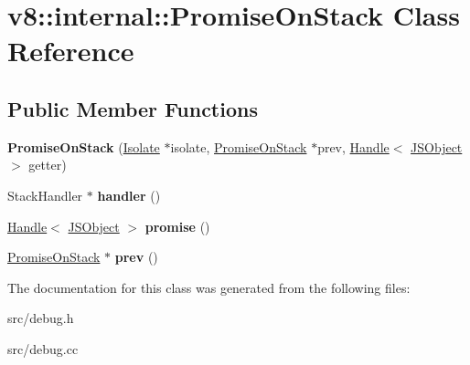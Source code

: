 \hypertarget{classv8_1_1internal_1_1_promise_on_stack}{}\section{v8\+:\+:internal\+:\+:Promise\+On\+Stack Class Reference}
\label{classv8_1_1internal_1_1_promise_on_stack}
\subsection*{Public Member Functions}
\begin{DoxyCompactItemize}
\item 
\hypertarget{classv8_1_1internal_1_1_promise_on_stack_abc2c4f50b63736600999b3a95c252835}{}{\bfseries Promise\+On\+Stack} (\hyperlink{classv8_1_1internal_1_1_isolate}{Isolate} $\ast$isolate, \hyperlink{classv8_1_1internal_1_1_promise_on_stack}{Promise\+On\+Stack} $\ast$prev, \hyperlink{classv8_1_1internal_1_1_handle}{Handle}$<$ \hyperlink{classv8_1_1internal_1_1_j_s_object}{J\+S\+Object} $>$ getter)\label{classv8_1_1internal_1_1_promise_on_stack_abc2c4f50b63736600999b3a95c252835}

\item 
\hypertarget{classv8_1_1internal_1_1_promise_on_stack_a4afb22e2bd5dc6d75c64a69a6cac0c6a}{}Stack\+Handler $\ast$ {\bfseries handler} ()\label{classv8_1_1internal_1_1_promise_on_stack_a4afb22e2bd5dc6d75c64a69a6cac0c6a}

\item 
\hypertarget{classv8_1_1internal_1_1_promise_on_stack_ae7cce8bf18b81022392d3194232d6600}{}\hyperlink{classv8_1_1internal_1_1_handle}{Handle}$<$ \hyperlink{classv8_1_1internal_1_1_j_s_object}{J\+S\+Object} $>$ {\bfseries promise} ()\label{classv8_1_1internal_1_1_promise_on_stack_ae7cce8bf18b81022392d3194232d6600}

\item 
\hypertarget{classv8_1_1internal_1_1_promise_on_stack_a520700e3bc23ba52968129f8540b2984}{}\hyperlink{classv8_1_1internal_1_1_promise_on_stack}{Promise\+On\+Stack} $\ast$ {\bfseries prev} ()\label{classv8_1_1internal_1_1_promise_on_stack_a520700e3bc23ba52968129f8540b2984}

\end{DoxyCompactItemize}


The documentation for this class was generated from the following files\+:\begin{DoxyCompactItemize}
\item 
src/debug.\+h\item 
src/debug.\+cc\end{DoxyCompactItemize}
